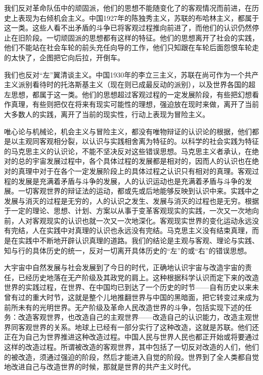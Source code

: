 我们反对革命队伍中的顽固派，他们的思想不能随变化了的客观情况而前进，在历史上表现为右倾机会主义。中国1927年的陈独秀主义，苏联的布哈林主义，都属于这一类。这些人看不出矛盾的斗争已将客观过程推向前进了，而他们的认识仍然停止在旧阶段。一切顽固派的思想都有这样的特征。他们的思想离开了社会的实践，他们不能站在社会车轮的前头充任向导的工作，他们只知跟在车轮后面怨恨车轮走的太快了，企图把它向后拉，开倒车。

我们也反对“左”翼清谈主义。中国1930年的李立三主义，苏联在尚可作为一个共产主义派别看待时的托洛斯基主义（现在则已成最反动的派别），以及世界各国的超左思想，都属于这一类。他们的思想超过客观过程的一定发展阶段，有些把幻想看作真理，有些则把仅在将来有现实可能性的理想，强迫放在现时来做，离开了当前大多数人的实践，离开了当前的现实性，行动上表现为冒险主义。

唯心论与机械论，机会主义与冒险主义，都没有唯物辩证的认识论的根据，他们都是以主观同客观相分裂，以认识与实践相舍离为特征的。以科学的社会实践为特征的马克思主义的认识论，不能不坚决反对这些错误思想。马克思主义者承认，在绝对的总的宇宙发展过程中，各个具体过程的发展都是相对的，因而人的认识也在绝对的真理中对于在各个一定发展阶段上的具体过程之认识只有相对的真理。客观过程的发展是充满着矛盾与斗争的发展，人的认识运动也是充满着矛盾与斗争的发展。一切客观世界的辩证法的运动，都或先或后地能够反映到认识中来。实践中之发展与消灭的过程是无穷的，人的认识之发生、发展与消灭的过程也是无穷。根据于一定的理论、思想、计划、方案以从事于变革客观现实的实践，一次又一次地向前，人对客观现实的认识也就一次又一次地深化。客观现实世界的变化运动永远没有完结，人在实践中对真理的认识也永远没有完结。马克思主义没有结束真理，而是在实践中不断地开辟认识真理的道路。我们的结论是主观与客观、理论与实践、知与行的具体历史的统一，反对一切离开具体历史的“左”的或“右”的错误思想。

大宇宙中自然发展与社会发展到了今日的时代，正确地认识宇宙与改造宇宙的责任，已经历史地落在无产阶级及其政党的肩上。这种根据科学认识而定下来的改造世界的实践过程，在世界、在中国均已到达了一个历史的时节——自有历史以来未曾有过的重大时节，这就是整个儿地推翻世界与中国的黑暗面，把它转变过来成为前所未有的光明世界。无产阶级及革命人民改造世界的斗争，包括实现下述的任务：改造客观世界，也改造自己的主观世界——改造自己的认识能力，改造主观世界同客观世界的关系。地球上已经有一部分实行了这种改造，这就是苏联。他们还正在为自己为世界推进这种改造过程。中国人民与世界人民也都正开始或将要通过这样的改造过程。所谓被改造的客观世界，其中包括了一切反对改造的人们，他们的被改造，须通过强迫的阶段，然后才能进入自觉的阶段。世界到了全人类都自觉地改进自己与改造世界的时候，那就是世界的共产主义时代。

